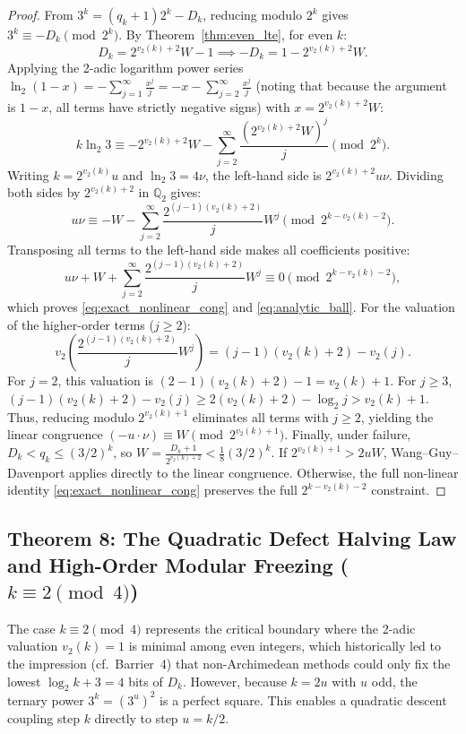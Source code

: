 \documentclass[11pt,reqno]{amsart}
\theoremstyle{definition}
\numberwithin{equation}{section}
\begin{document}
\begin{proof}
From $3^k = (q_k + 1)2^k - D_k$, reducing modulo $2^k$ gives $3^k \equiv -D_k \pmod{2^k}$.
By Theorem~\ref{thm:even_lte}, for even $k$:
\[
D_k = 2^{v_2(k)+2} W - 1 \implies -D_k = 1 - 2^{v_2(k)+2} W.
\]
Applying the 2-adic logarithm power series $\ln_2(1 - x) = -\sum_{j=1}^\infty \frac{x^j}{j} = -x - \sum_{j=2}^\infty \frac{x^j}{j}$ (noting that because the argument is $1 - x$, all terms have strictly negative signs) with $x = 2^{v_2(k)+2} W$:
\[
k \ln_2 3 \equiv -2^{v_2(k)+2} W - \sum_{j=2}^\infty \frac{(2^{v_2(k)+2} W)^j}{j} \pmod{2^k}.
\]
Writing $k = 2^{v_2(k)} u$ and $\ln_2 3 = 4 \nu$, the left-hand side is $2^{v_2(k)+2} u \nu$. Dividing both sides by $2^{v_2(k)+2}$ in $\mathbb{Q}_2$ gives:
\[
u \nu \equiv -W - \sum_{j=2}^\infty \frac{2^{(j-1)(v_2(k)+2)}}{j} W^j \pmod{2^{k - v_2(k) - 2}}.
\]
Transposing all terms to the left-hand side makes all coefficients positive:
\[
u \nu + W + \sum_{j=2}^\infty \frac{2^{(j-1)(v_2(k)+2)}}{j} W^j \equiv 0 \pmod{2^{k - v_2(k) - 2}},
\]
which proves \eqref{eq:exact_nonlinear_cong} and \eqref{eq:analytic_ball}.
For the valuation of the higher-order terms ($j \ge 2$):
\[
v_2\left( \frac{2^{(j-1)(v_2(k)+2)}}{j} W^j \right) = (j-1)(v_2(k)+2) - v_2(j).
\]
For $j = 2$, this valuation is $(2-1)(v_2(k)+2) - 1 = v_2(k) + 1$.
For $j \ge 3$, $(j-1)(v_2(k)+2) - v_2(j) \ge 2(v_2(k)+2) - \log_2 j > v_2(k)+1$.
Thus, reducing modulo $2^{v_2(k)+1}$ eliminates all terms with $j \ge 2$, yielding the linear congruence $(-u \cdot \nu) \equiv W \pmod{2^{v_2(k)+1}}$.
Finally, under failure, $D_k < q_k \le (3/2)^k$, so $W = \frac{D_k + 1}{2^{v_2(k)+2}} < \frac{1}{8}(3/2)^k$. If $2^{v_2(k)+1} > 2 u W$, Wang--Guy--Davenport applies directly to the linear congruence. Otherwise, the full non-linear identity \eqref{eq:exact_nonlinear_cong} preserves the full $2^{k - v_2(k) - 2}$ constraint.
\end{proof}

\subsection{\texorpdfstring{Theorem 8: The Quadratic Defect Halving Law and High-Order Modular Freezing ($k \equiv 2 \pmod 4$)}{Theorem 8: The Quadratic Defect Halving Law and High-Order Modular Freezing (k = 2 mod 4)}}

The case $k \equiv 2 \pmod 4$ represents the critical boundary where the 2-adic valuation $v_2(k) = 1$ is minimal among even integers, which historically led to the impression (cf.~Barrier~4) that non-Archimedean methods could only fix the lowest $\log_2 k + 3 = 4$ bits of $D_k$. However, because $k = 2u$ with $u$ odd, the ternary power $3^k = (3^u)^2$ is a perfect square. This enables a quadratic descent coupling step $k$ directly to step $u = k/2$.
\end{document}
